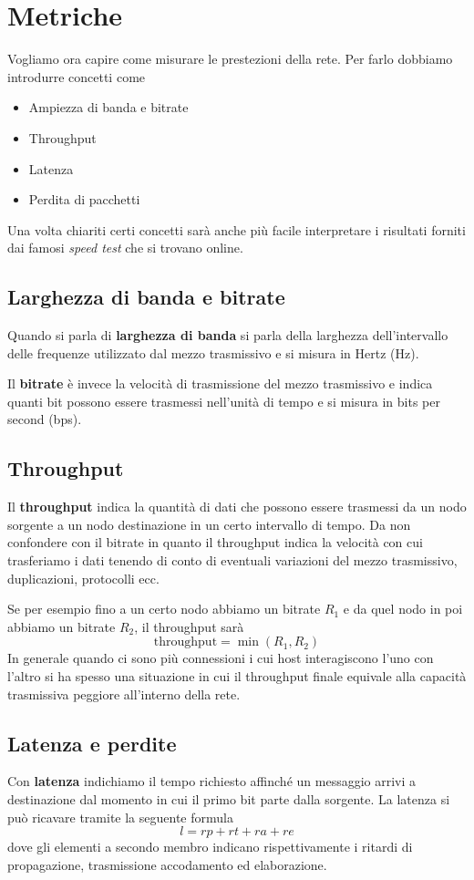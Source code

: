 \section{Metriche}
Vogliamo ora capire come misurare le prestezioni della rete. Per farlo 
dobbiamo introdurre concetti come
\begin{itemize}
	\item Ampiezza di banda e bitrate
	\item Throughput
	\item Latenza
	\item Perdita di pacchetti
\end{itemize}
Una volta chiariti certi concetti sarà anche più facile interpretare 
i risultati forniti dai famosi \emph{speed test} che si trovano online.

\subsection{Larghezza di banda e bitrate}
Quando si parla di \textbf{larghezza di banda} si parla della larghezza
dell'intervallo delle frequenze utilizzato dal mezzo trasmissivo e si 
misura in Hertz (Hz).

Il \textbf{bitrate} è invece la velocità di trasmissione del mezzo 
trasmissivo e indica quanti bit possono essere trasmessi nell'unità 
di tempo e si misura in bits per second (bps).

\subsection{Throughput}
Il \textbf{throughput} indica la quantità di dati che possono essere 
trasmessi da un nodo sorgente a un nodo destinazione in un certo 
intervallo di tempo. Da non confondere con il bitrate in quanto il 
throughput indica la velocità con cui trasferiamo i dati tenendo di 
conto di eventuali variazioni del mezzo trasmissivo, duplicazioni, 
protocolli ecc.

Se per esempio fino a un certo nodo abbiamo un bitrate $R_1$ e da quel 
nodo in poi abbiamo un bitrate $R_2$, il throughput sarà
\[ \text{throughput} = \min (R_1, R_2) \]
In generale quando ci sono più connessioni i cui host interagiscono 
l'uno con l'altro si ha spesso una situazione in cui il throughput 
finale equivale alla capacità trasmissiva peggiore all'interno della 
rete.

\subsection{Latenza e perdite}
Con \textbf{latenza} indichiamo il tempo richiesto affinché un 
messaggio arrivi a destinazione dal momento in cui il primo bit parte 
dalla sorgente. La latenza si può ricavare tramite la seguente formula
\[ l = rp + rt + ra + re \]
dove gli elementi a secondo membro indicano rispettivamente i ritardi 
di propagazione, trasmissione accodamento ed elaborazione.

